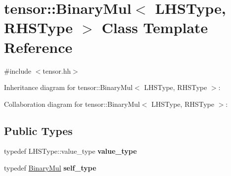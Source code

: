 \hypertarget{classtensor_1_1BinaryMul}{}\section{tensor\+:\+:Binary\+Mul$<$ L\+H\+S\+Type, R\+H\+S\+Type $>$ Class Template Reference}
\label{classtensor_1_1BinaryMul}


{\ttfamily \#include $<$tensor.\+hh$>$}



Inheritance diagram for tensor\+:\+:Binary\+Mul$<$ L\+H\+S\+Type, R\+H\+S\+Type $>$\+:


Collaboration diagram for tensor\+:\+:Binary\+Mul$<$ L\+H\+S\+Type, R\+H\+S\+Type $>$\+:
\subsection*{Public Types}
\begin{DoxyCompactItemize}
\item 
typedef L\+H\+S\+Type\+::value\+\_\+type {\bfseries value\+\_\+type}\hypertarget{classtensor_1_1BinaryMul_a3531048c90774770c8257fff70aff711}{}\label{classtensor_1_1BinaryMul_a3531048c90774770c8257fff70aff711}

\item 
typedef \hyperlink{classtensor_1_1BinaryMul}{Binary\+Mul} {\bfseries self\+\_\+type}\hypertarget{classtensor_1_1BinaryMul_a7c4b82a586dbaa3d92283231fd80560b}{}\label{classtensor_1_1BinaryMul_a7c4b82a586dbaa3d92283231fd80560b}

\end{DoxyCompactItemize}
